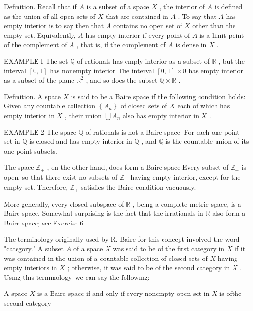 Definition. Recall that if \(A\) is a subset of a space \(X\) , the interior of \(A\) is defined as the union of all open sets of \(X\) that are contained in \(A\) . To say that \(A\) has empty interior is to say then that \(A\) contains no open set of \(X\) other than the empty set. Equivalently, \(A\) has empty interior if every point of \(A\) is a limit point of the complement of \(A\) , that is, if the complement of \(A\) is dense in \(X\) .

EXAMPLE I The set \(\mathbb{Q}\) of rationals has emply interior as a subset of \(\mathbb{R}\) , but the interval \(\left\lbrack  {0,1}\right\rbrack\) has nonempty interior The interval \(\left\lbrack  {0,1}\right\rbrack   \times  0\) has empty interior as a subset of the plane \({\mathbb{R}}^{2}\) , and so does the subset \(\mathbb{Q} \times  \mathbb{R}\) .

Definition. A space \(X\) is said to be a Baire space if the following condition holds: Given any countable collection \(\left\{  {A}_{n}\right\}\) of closed sets of \(X\) each of which has empty interior in \(X\) , their union \(\bigcup {A}_{n}\) also has empty interior in \(X\) .

EXAMPLE 2 The space \(\mathbb{Q}\) of rationals is not a Baire space. For each one-point set in \(\mathbb{Q}\) is closed and has empty interior in \(\mathbb{Q}\) , and \(\mathbb{Q}\) is the countable union of its one-point subsets.

The space \({\mathbb{Z}}_{ + }\) , on the other hand, does form a Baire space Every subset of \({\mathbb{Z}}_{ + }\) is open, so that there exist no subsets of \({\mathbb{Z}}_{ + }\) having empty interior, except for the empty set. Therefore, \({\mathbb{Z}}_{ + }\) satisfies the Baire condition vacuously.

More generally, every closed subspace of \(\mathbb{R}\) , being a complete metric space, is a Baire space. Somewhat surprising is the fact that the irrationals in \(\mathbb{R}\) also form a Baire space; see Exercise 6

The terminology originally used by R. Baire for this concept involved the word "category." A subset \(A\) of a space \(X\) was said to be of the first category in \(X\) if it was contained in the union of a countable collection of closed sets of \(X\) having empty interiors in \(X\) ; otherwise, it was said to be of the second category in \(X\) . Using this terminology, we can say the following:

A space \(X\) is a Baire space if and only if every nonempty open set in \(X\) is ofthe second category

